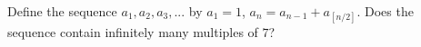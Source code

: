 Define the sequence $a_1, a_2, a_3, ...$ by $a_1 = 1$, $a_n = a_{n-1} + a_{[n/2]}$. Does the sequence contain infinitely many multiples of $7$?